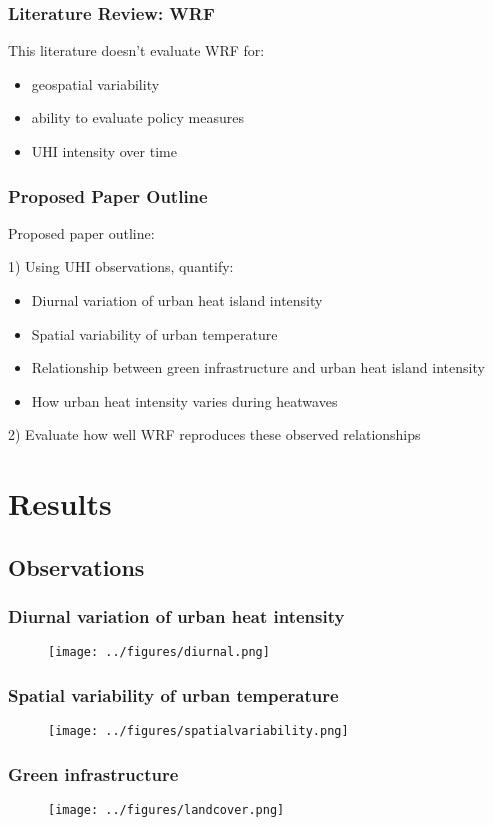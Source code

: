 \documentclass[aspectratio=169, 10pt]{beamer}
\begin{document}
\begin{frame}
\frametitle{Literature Review: WRF}
This literature doesn't evaluate WRF for: 
\begin{itemize}
\item geospatial variability
\item ability to evaluate policy measures
\item UHI intensity over time
\end{itemize}
\end{frame}

\begin{frame}
\frametitle{Proposed Paper Outline}

Proposed paper outline: 


1) Using UHI observations, quantify: 
\begin{itemize}
\item Diurnal variation of urban heat island intensity
\item Spatial variability of urban temperature
\item Relationship between green infrastructure and urban heat island intensity
\item How urban heat intensity varies during heatwaves
\end{itemize}
2) Evaluate how well WRF reproduces these observed relationships 
\end{frame}
\section{Results}
\subsection{Observations}
\begin{frame}
\frametitle{Diurnal variation of urban heat intensity}
\begin{figure}
\texttt{[image: ../figures/diurnal.png]}
\end{figure}
\end{frame}

\begin{frame}
\frametitle{Spatial variability of urban temperature}
\begin{figure}
\texttt{[image: ../figures/spatialvariability.png]}
\end{figure}
\end{frame}

\begin{frame}
\frametitle{Green infrastructure}
\begin{figure}
\texttt{[image: ../figures/landcover.png]}
\end{figure}
\end{frame}
\end{document}
